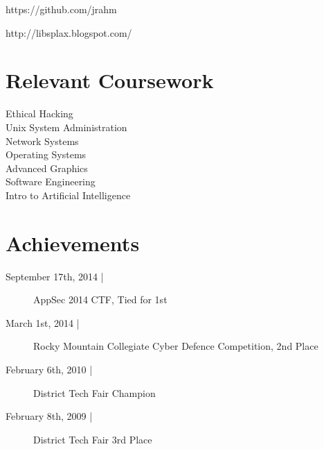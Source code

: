 \documentclass[letterpaper]{deedy-resume} %
\begin{document}
\begin{minipage}[t]{0.33\textwidth}
https://github.com/jrahm


http://libsplax.blogspot.com/

\sectionspace %


\section{Relevant Coursework}

Ethical Hacking \\
Unix System Administration \\
Network Systems \\
Operating Systems \\
Advanced Graphics \\
Software Engineering \\
Intro to Artificial Intelligence

\sectionspace %
\section{Achievements} 

\begin{description}
\item[September 17th, 2014 |]
    AppSec 2014 CTF, Tied for 1st
\item[March 1st, 2014 |]
    Rocky Mountain Collegiate Cyber Defence Competition, 2nd Place
\item[February 6th, 2010 |]
    District Tech Fair Champion
\item[February 8th, 2009 |]
    District Tech Fair 3rd Place
\end{description}


\end{minipage} %
\hfill
%
%
\end{document}
